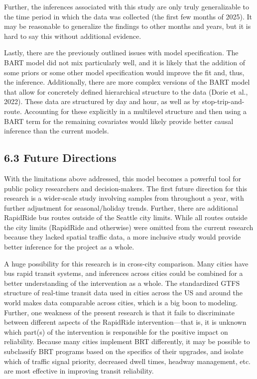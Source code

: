\documentclass[
  12pt,
]{article}
\begin{document}
Further, the inferences associated with this study are only truly
generalizable to the time period in which the data was collected (the
first few months of 2025). It may be reasonable to generalize the
findings to other months and years, but it is hard to say this without
additional evidence.

Lastly, there are the previously outlined issues with model
specification. The BART model did not mix particularly well, and it is
likely that the addition of some priors or some other model
specification would improve the fit and, thus, the inference.
Additionally, there are more complex versions of the BART model that
allow for concretely defined hierarchical structure to the data (Dorie
et al., 2022). These data are structured by day and hour, as well as by
stop-trip-and-route. Accounting for these explicitly in a multilevel
structure and then using a BART term for the remaining covariates would
likely provide better causal inference than the current models.

\subsection{6.3 Future Directions}\label{future-directions}

With the limitations above addressed, this model becomes a powerful tool
for public policy researchers and decision-makers. The first future
direction for this research is a wider-scale study involving samples
from throughout a year, with further adjustment for seasonal/holiday
trends. Further, there are additional RapidRide bus routes outside of
the Seattle city limits. While all routes outside the city limits
(RapidRide and otherwise) were omitted from the current research because
they lacked spatial traffic data, a more inclusive study would provide
better inference for the project as a whole.

A huge possibility for this research is in cross-city comparison. Many
cities have bus rapid transit systems, and inferences across cities
could be combined for a better understanding of the intervention as a
whole. The standardized GTFS structure of real-time transit data used in
cities across the US and around the world makes data comparable across
cities, which is a big boon to modeling. Further, one weakness of the
present research is that it fails to discriminate between different
aspects of the RapidRide intervention---that is, it is unknown which
part(s) of the intervention is responsible for the positive impact on
reliability. Because many cities implement BRT differently, it may be
possible to subclassify BRT programs based on the specifics of their
upgrades, and isolate which of traffic signal priority, decreased dwell
times, headway management, etc. are most effective in improving transit
reliability.
\end{document}
